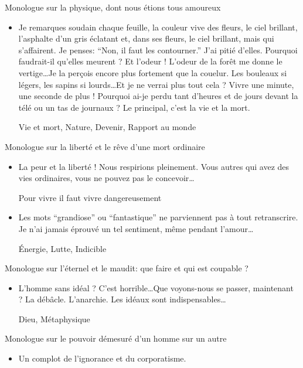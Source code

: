 \documentclass[french,a4paper,11pt,answers]{exam}
\newcommand{\cit}[2]{\og #1 \fg{} \begin{solution}{ #2 }\end{solution}} %
\begin{document}
	\begin{cadre}{Monologue sur la physique{,} dont nous étions tous amoureux}
		\begin{itemize}
			\item \cit{Je remarques soudain chaque feuille, la couleur vive des fleurs, le ciel brillant, l'asphalte d'un gris éclatant et, dans ses fleurs, le ciel brillant, mais qui s'affairent. Je penses: “Non, il faut les contourner.'' J'ai pitié d'elles. Pourquoi faudrait-il qu'elles meurent ? Et l'odeur ! L'odeur de la forêt me donne le vertige\ldots Je la perçois encore plus fortement que la couelur. Les bouleaux si légers, les sapins si lourds\ldots Et je ne verrai plus tout cela ? Vivre une minute, une seconde de plus ! Pourquoi ai-je perdu tant d'heures et de jours devant la télé ou un tas de journaux ? Le principal, c'est la vie et la mort.}
				{Vie et mort, Nature, Devenir, Rapport au monde}
		\end{itemize}
	\end{cadre}
	
	\begin{cadre}{Monologue sur la liberté et le rêve d'une mort ordinaire}
		\begin{itemize}
			\item \cit{La peur et la liberté ! Nous respirions pleinement. Vous autres qui avez des vies ordinaires, vous ne pouvez pas le concevoir\ldots}
				{Pour vivre il faut vivre dangereusement}
			\item \cit{Les mots “grandiose'' ou “fantastique'' ne parviennent pas à tout retranscrire. Je n'ai jamais éprouvé un tel sentiment, même pendant l'amour\ldots}
				{Énergie, Lutte, Indicible}
		\end{itemize}
	\end{cadre}
	
	\begin{cadre}{Monologue sur l'éternel et le maudit: que faire et qui est coupable ?}
		\begin{itemize}
			\item \cit{L'homme sans idéal ? C'est horrible\ldots Que voyons-nous se passer, maintenant ? La débâcle. L'anarchie. Les idéaux sont indispensables\ldots}
				{Dieu, Métaphysique}
		\end{itemize}
	\end{cadre}
	
	\begin{cadre}{Monologue sur le pouvoir démesuré d'un homme sur un autre}
		\begin{itemize}
			\item \cit{Un complot de l'ignorance et du corporatisme.}
				{}
		\end{itemize}
	\end{cadre}
	
\end{document}

